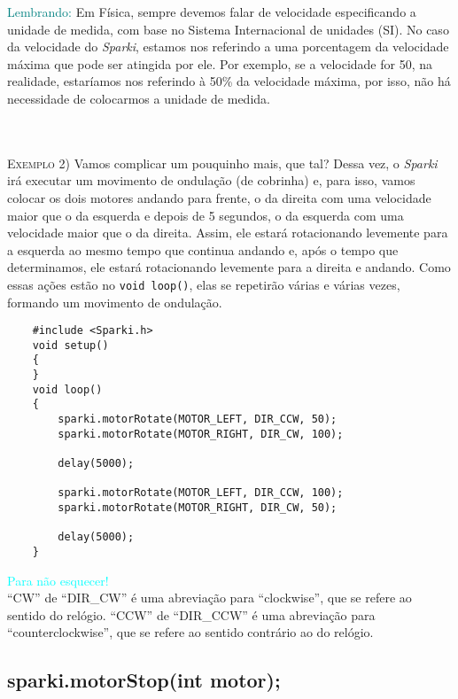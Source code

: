 \begin{center}
    \textcolor{teal}{Lembrando:} Em Física, sempre devemos falar de velocidade especificando a unidade de medida, com base no Sistema Internacional de unidades (SI). No caso da velocidade do \textsl{Sparki}, estamos nos referindo a uma porcentagem da velocidade máxima que pode ser atingida por ele. Por exemplo, se a velocidade for 50, na realidade, estaríamos nos referindo à 50\% da velocidade máxima, por isso, não há necessidade de colocarmos a unidade de medida.
\end{center}
\\~\\

\textsc{Exemplo 2)} Vamos complicar um pouquinho mais, que tal? Dessa vez, o \textsl{Sparki} irá executar um movimento de ondulação (de cobrinha) e, para isso, vamos colocar os dois motores andando para frente, o da direita com uma velocidade maior que o da esquerda e depois de 5 segundos, o da esquerda com uma velocidade maior que o da direita. Assim, ele estará rotacionando levemente para a esquerda ao mesmo tempo que continua andando e, após o tempo que determinamos, ele estará rotacionando levemente para a direita e andando. Como essas ações estão no \texttt{void loop()}, elas se repetirão várias e várias vezes, formando um movimento de ondulação.

\begin{verbatim}
    #include <Sparki.h>
    void setup()
    {
    }
    void loop()
    {
        sparki.motorRotate(MOTOR_LEFT, DIR_CCW, 50);
        sparki.motorRotate(MOTOR_RIGHT, DIR_CW, 100);
        
        delay(5000);
        
        sparki.motorRotate(MOTOR_LEFT, DIR_CCW, 100);
        sparki.motorRotate(MOTOR_RIGHT, DIR_CW, 50);
        
        delay(5000);
    }
\end{verbatim}

\begin{center}
    \textcolor{cyan}{Para não esquecer!}
    \\``CW'' de ``DIR\_CW'' é uma abreviação para ``clockwise'', que se refere ao sentido do relógio. ``CCW'' de ``DIR\_CCW'' é uma abreviação para ``counterclockwise'', que se refere ao sentido contrário ao do relógio.
\end{center}

\subsection{sparki.motorStop(int motor);}
